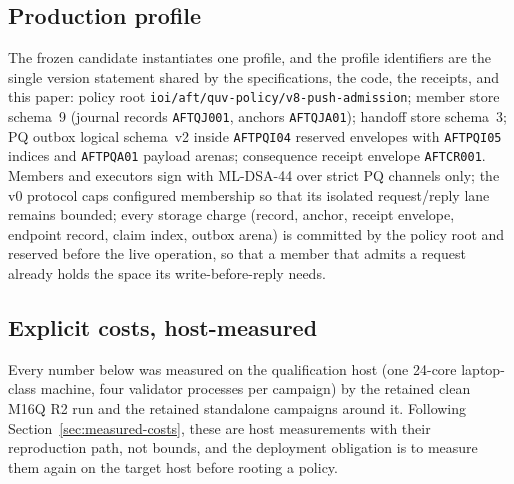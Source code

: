 \documentclass[11pt]{article}
\newcommand{\code}[1]{\texttt{#1}}
\begin{document}
\subsection{Production profile}
\label{sec:quv-profile}

The frozen candidate instantiates one profile, and the profile identifiers
are the single version statement shared by the specifications, the code, the
receipts, and this paper: policy root
\code{ioi/aft/quv-policy/v8-push-admission}; member store schema~9
(journal records \code{AFTQJ001}, anchors \code{AFTQJA01}); handoff store
schema~3; PQ outbox logical schema~v2 inside \code{AFTPQI04} reserved
envelopes with \code{AFTPQI05} indices and \code{AFTPQA01} payload arenas;
consequence receipt envelope \code{AFTCR001}. Members and executors sign with
ML-DSA-44 over strict PQ channels only; the v0 protocol caps configured
membership so that its isolated request/reply lane remains bounded; every
storage charge (record, anchor, receipt envelope, endpoint record, claim
index, outbox arena) is committed by the policy root and reserved before the
live operation, so that a member that admits a request already holds the
space its write-before-reply needs.

\subsection{Explicit costs, host-measured}
\label{sec:quv-costs}

Every number below was measured on the qualification host (one 24-core
laptop-class machine, four validator processes per campaign) by the retained
clean M16Q R2 run and the retained standalone campaigns around it. Following
Section~\ref{sec:measured-costs}, these are host measurements with their
reproduction path, not bounds, and the deployment obligation is to measure
them again on the target host before rooting a policy.
\end{document}
